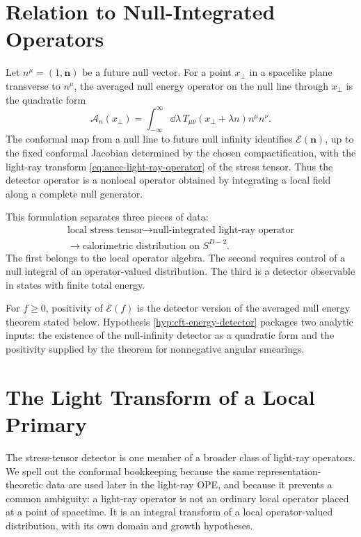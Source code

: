 \section{Relation to Null-Integrated Operators}

Let \(n^\mu=(1,\mathbf n)\) be a future null vector.  For a point
\(x_\perp\) in a spacelike plane transverse to \(n^\mu\), the averaged null
energy operator on the null line through \(x_\perp\) is the quadratic form
\begin{equation}
  \mathcal A_n(x_\perp)
  =
  \int_{-\infty}^{\infty}\dd\lambda\,
  T_{\mu\nu}(x_\perp+\lambda n)n^\mu n^\nu .
  \label{eq:anec-light-ray-operator}
\end{equation}
The conformal map from a null line to future null infinity identifies
\(\mathcal E(\mathbf n)\), up to the fixed conformal Jacobian determined by
the chosen compactification, with the light-ray transform
\eqref{eq:anec-light-ray-operator} of the stress tensor.  Thus the detector
operator is a nonlocal operator obtained by integrating a local field along a
complete null generator.

This formulation separates three pieces of data:
\[
  \begin{gathered}
  \text{local stress tensor}
  \longrightarrow
  \text{null-integrated light-ray operator}
  \\
  \longrightarrow
  \text{calorimetric distribution on }S^{D-2}.
  \end{gathered}
\]
The first belongs to the local operator algebra.  The second requires control
of a null integral of an operator-valued distribution.  The third is a
detector observable in states with finite total energy.

For \(f\geq0\), positivity of \(\mathcal E(f)\) is the detector version of the
averaged null energy theorem stated below.  Hypothesis
\ref{hyp:cft-energy-detector} packages two analytic inputs: the existence of
the null-infinity detector as a quadratic form and the positivity supplied by
the theorem for nonnegative angular smearings.

\section{The Light Transform of a Local Primary}
\label{sec:cft-light-transform-local-primary}

The stress-tensor detector is one member of a broader class of light-ray
operators.  We spell out the conformal bookkeeping because the same
representation-theoretic data are used later in the light-ray OPE, and because
it prevents a common ambiguity: a light-ray operator is not an ordinary local
operator placed at a point of spacetime.  It is an integral transform of a
local operator-valued distribution, with its own domain and growth
hypotheses.

